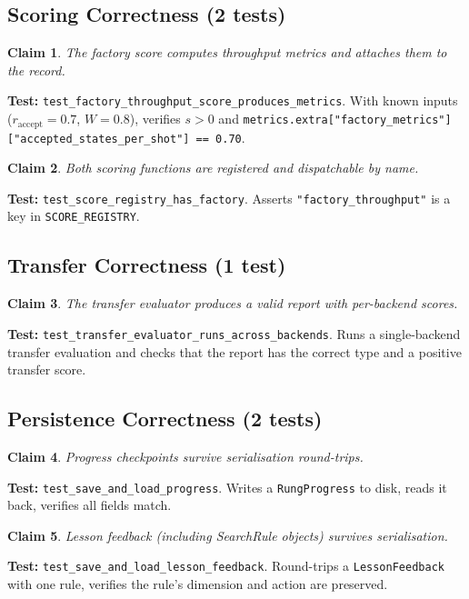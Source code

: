 \documentclass[11pt,a4paper]{article}
\newtheorem{claim}{Claim}[section]
\newcommand{\code}[1]{\texttt{#1}}
\begin{document}
\subsection{Scoring Correctness (2 tests)}

\begin{claim}
\label{claim:factory}
The factory score computes throughput metrics and attaches them to the record.
\end{claim}
\textbf{Test:} \code{test\_factory\_throughput\_score\_produces\_metrics}.
With known inputs ($r_{\text{accept}} = 0.7$, $W = 0.8$), verifies $s > 0$
and \code{metrics.extra["factory\_metrics"]["accepted\_states\_per\_shot"]
== 0.70}.

\begin{claim}
\label{claim:registry}
Both scoring functions are registered and dispatchable by name.
\end{claim}
\textbf{Test:} \code{test\_score\_registry\_has\_factory}. Asserts
\code{"factory\_throughput"} is a key in \code{SCORE\_REGISTRY}.

\subsection{Transfer Correctness (1 test)}

\begin{claim}
\label{claim:transfer}
The transfer evaluator produces a valid report with per-backend scores.
\end{claim}
\textbf{Test:} \code{test\_transfer\_evaluator\_runs\_across\_backends}.
Runs a single-backend transfer evaluation and checks that the report has
the correct type and a positive transfer score.

\subsection{Persistence Correctness (2 tests)}

\begin{claim}
\label{claim:progress}
Progress checkpoints survive serialisation round-trips.
\end{claim}
\textbf{Test:} \code{test\_save\_and\_load\_progress}. Writes a
\code{RungProgress} to disk, reads it back, verifies all fields match.

\begin{claim}
\label{claim:feedback_persist}
Lesson feedback (including SearchRule objects) survives serialisation.
\end{claim}
\textbf{Test:} \code{test\_save\_and\_load\_lesson\_feedback}. Round-trips a
\code{LessonFeedback} with one rule, verifies the rule's dimension and action
are preserved.
\end{document}
